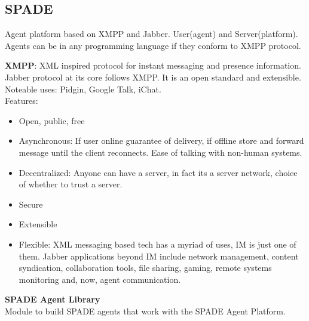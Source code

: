 \documentclass[a4paper, 11pt]{article}
\begin{document}
\subsection{SPADE}

Agent platform based on XMPP and Jabber. User(agent) and Server(platform). Agents can be in any programming language if they conform to XMPP protocol.

\textbf{XMPP}: XML inspired protocol for instant messaging and presence information. Jabber protocol at its core follows XMPP. It is an open standard and extensible. Noteable uses: Pidgin, Google Talk, iChat. \\
Features: \\
\begin{itemize}
	\item Open, public, free
	\item Asynchronous: If user online guarantee of delivery, if offline store and forward message until the client reconnects. Ease of talking with non-human systems.
	\item Decentralized: Anyone can have a server, in fact its a server network, choice of whether to trust a server.
	\item Secure
	\item Extensible
	\item Flexible: XML messaging based tech has a myriad of uses, IM is just one of them. Jabber applications beyond IM include network management, content syndication, collaboration tools, file sharing, gaming, remote systems monitoring and, now, agent communication.
\end{itemize}

\textbf{SPADE Agent Library}\\
Module to build SPADE agents that work with the SPADE Agent Platform.
\end{document}
